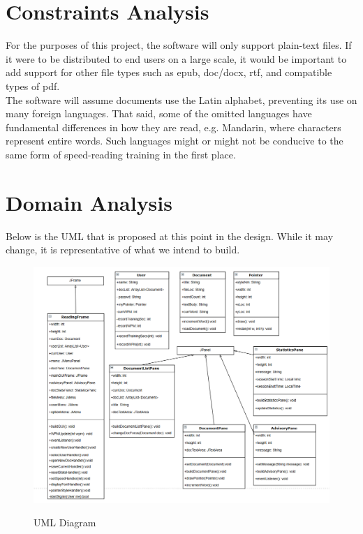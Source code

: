 \documentclass{article}
\begin{document}
\clearpage

\section*{Constraints Analysis}{

	For the purposes of this project, the software will only support plain-text files. If it were to be distributed to end users on a large scale, it would be important to add support for other file types such as epub, doc/docx, rtf, and compatible types of pdf.\\

	The software will assume documents use the Latin alphabet, preventing its use on many foreign languages. That said, some of the omitted languages have fundamental differences in how they are read, e.g. Mandarin, where characters represent entire words. Such languages might or might not be conducive to the same form of speed-reading training in the first place.\\
}

\clearpage

\section*{Domain Analysis}{

	Below is the UML that is proposed at this point in the design. While it may change, it is representative of what we intend to build.\\

	\begin{figure}[!htb]
		\centering
		\includegraphics[scale=.5]{UMLDiagram.png}
		\label{fig:fig1}
		\caption{UML Diagram}
	\end{figure}
}
\end{document}
